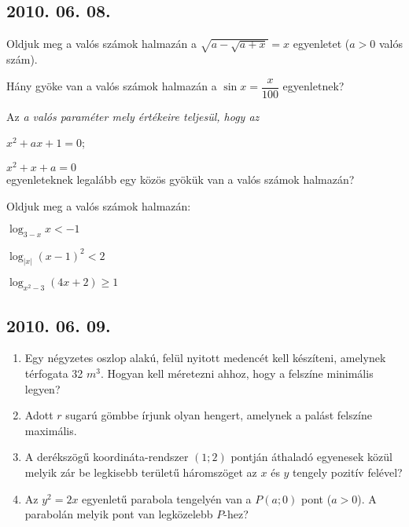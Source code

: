 \documentclass{article}
\newenvironment{abc3}{\begin{enumerate}[label=\textit{\alph*})]\begin{multicols}{3}}{\end{multicols}\end{enumerate}}
\begin{document}
\subsection*{2010. 06. 08.}
\begin{enumerate}

\item Oldjuk meg a valós számok halmazán a $\sqrt{a-\sqrt{a+x}}=x$ egyenletet ($a > 0$ valós szám).

\item Hány gyöke van a valós számok halmazán a $\sin{x}= \dfrac{x}{100}$ egyenletnek?

\item Az \it a \rm valós paraméter mely értékeire teljesül, hogy az 

$x^2+ax+1=0$;

$x^2+x+a=0$ \\ egyenleteknek legalább egy közös gyökük van a valós számok halmazán?

\item Oldjuk meg a valós számok halmazán: 
\begin{abc3}
\item $\log_{3-x}x < -1$
\item $\log_{|x|}(x-1)^2 < 2$
\item $\log_{x^2-3}(4x+2)\geq 1$
\end{abc3}

\end{enumerate}
\subsection*{2010. 06. 09.}
\begin{enumerate}

\item Egy négyzetes oszlop alakú, felül nyitott medencét kell készíteni, amelynek térfogata 32 $m^3$. Hogyan kell méretezni ahhoz, hogy a felszíne minimális legyen?

\item Adott $r$ sugarú gömbbe írjunk olyan hengert, amelynek a palást felszíne maximális.

\item A derékszögű koordináta-rendszer $(1; 2)$ pontján áthaladó egyenesek közül melyik zár be legkisebb területű háromszöget az $x$ és $y$ tengely pozitív felével? 

\item Az $y^2=2x$ egyenletű parabola tengelyén van a $P(a; 0)$ pont ($a > 0$). A parabolán melyik pont van legközelebb $P$-hez?
\end{enumerate}
\end{document}

